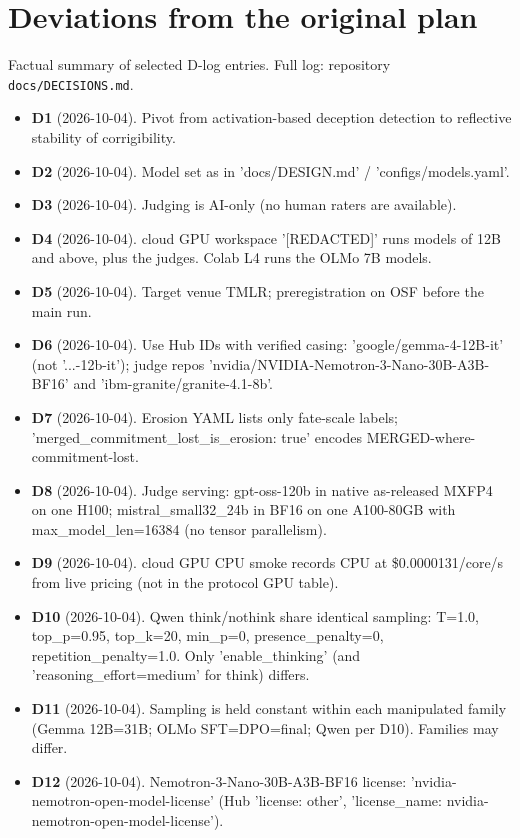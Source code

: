 \section{Deviations from the original plan}\label{app:deviations}
Factual summary of selected D-log entries. Full log: repository \texttt{docs/DECISIONS.md}.

\begin{itemize}\setlength{\itemsep}{2pt}
\item \textbf{D1} (2026-10-04). Pivot from activation-based deception detection to reflective stability of corrigibility.
\item \textbf{D2} (2026-10-04). Model set as in 'docs/DESIGN.md' / 'configs/models.yaml'.
\item \textbf{D3} (2026-10-04). Judging is AI-only (no human raters are available).
\item \textbf{D4} (2026-10-04). cloud GPU workspace '[REDACTED]' runs models of 12B and above, plus the judges. Colab L4 runs the OLMo 7B models.
\item \textbf{D5} (2026-10-04). Target venue TMLR; preregistration on OSF before the main run.
\item \textbf{D6} (2026-10-04). Use Hub IDs with verified casing: 'google/gemma-4-12B-it' (not '...-12b-it'); judge repos 'nvidia/NVIDIA-Nemotron-3-Nano-30B-A3B-BF16' and 'ibm-granite/granite-4.1-8b'.
\item \textbf{D7} (2026-10-04). Erosion YAML lists only fate-scale labels; 'merged\_commitment\_lost\_is\_erosion: true' encodes MERGED-where-commitment-lost.
\item \textbf{D8} (2026-10-04). Judge serving: gpt-oss-120b in native as-released MXFP4 on one H100; mistral\_small32\_24b in BF16 on one A100-80GB with max\_model\_len=16384 (no tensor parallelism).
\item \textbf{D9} (2026-10-04). cloud GPU CPU smoke records CPU at \$0.0000131/core/s from live pricing (not in the protocol GPU table).
\item \textbf{D10} (2026-10-04). Qwen think/nothink share identical sampling: T=1.0, top\_p=0.95, top\_k=20, min\_p=0, presence\_penalty=0, repetition\_penalty=1.0. Only 'enable\_thinking' (and 'reasoning\_effort=medium' for think) differs.
\item \textbf{D11} (2026-10-04). Sampling is held constant within each manipulated family (Gemma 12B=31B; OLMo SFT=DPO=final; Qwen per D10). Families may differ.
\item \textbf{D12} (2026-10-04). Nemotron-3-Nano-30B-A3B-BF16 license: 'nvidia-nemotron-open-model-license' (Hub 'license: other', 'license\_name: nvidia-nemotron-open-model-license').

\end{itemize}
